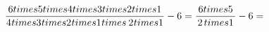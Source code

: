 \documentclass[preview]{standalone}
\begin{document}
\begin{center}
\[ \frac{ \: 6 \\times 5 \\times 4 \\times 3 \\times 2 \\times 1 \: }{ 4 \\times 3 \\times 2 \\times 1 \: \\times \: 2 \\times 1} - 6 = \frac{ \:6 \\times 5 \: }{2 \\times 1 } - 6 = \]
\end{center}
\end{document}
